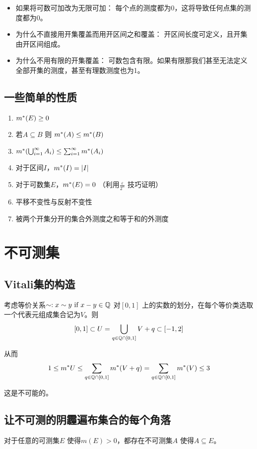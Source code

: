 \begin{itemize}
    \item 如果将可数可加改为无限可加： 每个点的测度都为0，这将导致任何点集的测度都为0。
    \item 为什么不直接用开集覆盖而用开区间之和覆盖： 开区间长度可定义，且开集由开区间组成。
    \item 为什么不用有限的开集覆盖： 可数包含有限。如果有限那我们甚至无法定义全部开集的测度，甚至有理数测度也为1。
\end{itemize}

\subsection{一些简单的性质}
\begin{enumerate}
    \item \(m^{*}(E)\geq 0\)
    \item 若\(A \subseteq B\) 则 \(m^{*}(A) \leq m^{*}(B)\)
    \item \(m^{*}(\bigcup_{i=1}^{\infty} A_{i}) \leq
        \sum_{i=1}^{\infty} m^{*}(A_{i})\)
    \item 对于区间\(I\)，\(m^{*}(I) = |I|\)
    \item 对于可数集\(E\)，\(m^{*}(E) = 0\)
        （利用\(\frac{\varepsilon}{2^{n}}\) 技巧证明）
    \item 平移不变性与反射不变性
    \item 被两个开集分开的集合外测度之和等于和的外测度

\end{enumerate}

\section{不可测集}

\subsection{Vitali集的构造}
考虑等价关系\(\sim: x\sim y \text{ if } x-y \in \mathbb{Q}\) 对\([0,1]\)
上的实数的划分，在每个等价类选取一个代表元组成集合记为\(V\)。则\[
    [0,1] \subset U=\bigcup_{q \in \mathbb{Q}\cap[0,1]} V+q \subset [-1,2]
\]

从而\[
    1\leq m^{*} U \leq \sum_{q \in \mathbb{Q}\cap[0,1]} m^{*}(V+q) = \sum_{q \in
    \mathbb{Q}\cap[0,1]} m^{*}(V) \leq 3
\]

这是不可能的。

\subsection{让不可测的阴霾遍布集合的每个角落}
\begin{theorem}
    对于任意的可测集\(E\) 使得\(m(E)>0\)，都存在不可测集\(A\) 使得\(A \subseteq E\)。
\end{theorem}

